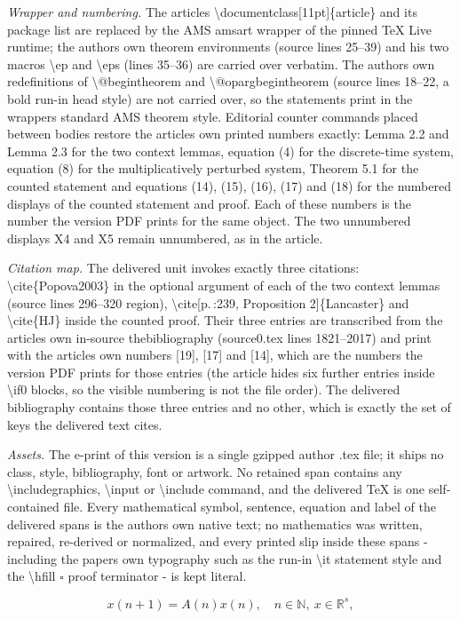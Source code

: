 \documentclass[10pt,a4paper]{amsart}
\theoremstyle{plain}
\begin{document}
\noindent\textit{Wrapper and numbering.} The article\textquotesingle s \textbackslash{}documentclass[11pt]\{article\} and its package list are replaced by the AMS amsart wrapper of the pinned TeX Live runtime; the author\textquotesingle s own theorem environments (source lines 25--39) and his two macros \textbackslash{}ep and \textbackslash{}eps (lines 35--36) are carried over verbatim. The author\textquotesingle s own redefinitions of \textbackslash{}@begintheorem and \textbackslash{}@opargbegintheorem (source lines 18--22, a bold run-in head style) are not carried over, so the statements print in the wrapper\textquotesingle s standard AMS theorem style. Editorial counter commands placed between bodies restore the article\textquotesingle s own printed numbers exactly: Lemma 2.2 and Lemma 2.3 for the two context lemmas, equation (4) for the discrete-time system, equation (8) for the multiplicatively perturbed system, Theorem 5.1 for the counted statement and equations (14), (15), (16), (17) and (18) for the numbered displays of the counted statement and proof. Each of these numbers is the number the version PDF prints for the same object. The two unnumbered displays X4 and X5 remain unnumbered, as in the article.\par
\noindent\textit{Citation map.} The delivered unit invokes exactly three citations: \textbackslash{}cite\{Popova2003\} in the optional argument of each of the two context lemmas (source lines 296--320 region), \textbackslash{}cite[p.\,:239, Proposition 2]\{Lancaster\} and \textbackslash{}cite\{HJ\} inside the counted proof. Their three entries are transcribed from the article\textquotesingle s own in-source thebibliography (source0.tex lines 1821--2017) and print with the article\textquotesingle s own numbers [19], [17] and [14], which are the numbers the version PDF prints for those entries (the article hides six further entries inside \textbackslash{}if0 blocks, so the visible numbering is not the file order). The delivered bibliography contains those three entries and no other, which is exactly the set of keys the delivered text cites.\par
\noindent\textit{Assets.} The e-print of this version is a single gzipped author .tex file; it ships no class, style, bibliography, font or artwork. No retained span contains any \textbackslash{}includegraphics, \textbackslash{}input or \textbackslash{}include command, and the delivered TeX is one self-contained file. Every mathematical symbol, sentence, equation and label of the delivered spans is the authors\textquotesingle{} own native text; no mathematics was written, repaired, re-derived or normalized, and every printed slip inside these spans - including the paper\textquotesingle s own typography such as the run-in \textbackslash{}it statement style and the \textbackslash{}hfill $\square$ proof terminator - is kept literal.\par
\setcounter{equation}{3}
\begin{equation}
x(n+1)=A(n)x(n),\quad n\in \mathbb{N},~x\in \mathbb{R}^{s},  \label{2}
\end{equation}%
\end{document}

